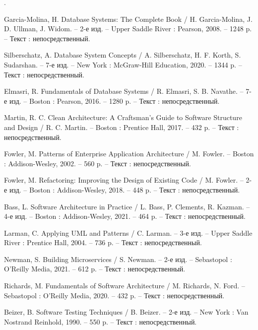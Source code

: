 \begin{list}{.}
\item Garcia-Molina, H. Database Systems: The Complete Book / H. Garcia-Molina, J. D. Ullman, J. Widom. – 2-е изд. – Upper Saddle River : Pearson, 2008. – 1248 p. – Текст : непосредственный.

\item Silberschatz, A. Database System Concepts / A. Silberschatz, H. F. Korth, S. Sudarshan. – 7-е изд. – New York : McGraw-Hill Education, 2020. – 1344 p. – Текст : непосредственный.

\item Elmasri, R. Fundamentals of Database Systems / R. Elmasri, S. B. Navathe. – 7-е изд. – Boston : Pearson, 2016. – 1280 p. – Текст : непосредственный.

\item Martin, R. C. Clean Architecture: A Craftsman's Guide to Software Structure and Design / R. C. Martin. – Boston : Prentice Hall, 2017. – 432 p. – Текст : непосредственный.

\item Fowler, M. Patterns of Enterprise Application Architecture / M. Fowler. – Boston : Addison-Wesley, 2002. – 560 p. – Текст : непосредственный.

\item Fowler, M. Refactoring: Improving the Design of Existing Code / M. Fowler. – 2-е изд. – Boston : Addison-Wesley, 2018. – 448 p. – Текст : непосредственный.

\item Bass, L. Software Architecture in Practice / L. Bass, P. Clements, R. Kazman. – 4-е изд. – Boston : Addison-Wesley, 2021. – 464 p. – Текст : непосредственный.

\item Larman, C. Applying UML and Patterns / C. Larman. – 3-е изд. – Upper Saddle River : Prentice Hall, 2004. – 736 p. – Текст : непосредственный.

\item Newman, S. Building Microservices / S. Newman. – 2-е изд. – Sebastopol : O'Reilly Media, 2021. – 612 p. – Текст : непосредственный.

\item Richards, M. Fundamentals of Software Architecture / M. Richards, N. Ford. – Sebastopol : O'Reilly Media, 2020. – 432 p. – Текст : непосредственный.

\item Beizer, B. Software Testing Techniques / B. Beizer. – 2-е изд. – New York : Van Nostrand Reinhold, 1990. – 550 p. – Текст : непосредственный.


\end{list}
